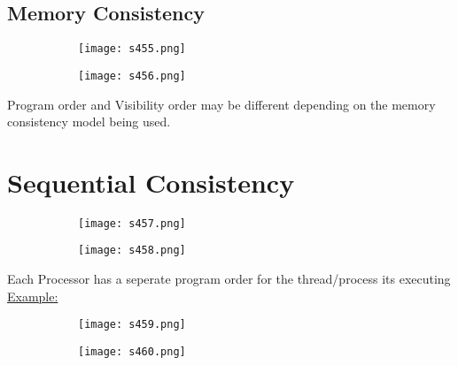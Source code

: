 \documentclass[8pt]{extreport}
\begin{document}
\subsection{Memory Consistency}
 \begin{figure}[H]
\begin{subfigure}[b]{0.4\linewidth}
\texttt{[image: s455.png]}
\end{subfigure}
\begin{subfigure}[b]{0.4\linewidth}
\texttt{[image: s456.png]}
\end{subfigure}
\end{figure}
Program order and Visibility order may be different depending on the memory consistency model being used.

\section{Sequential Consistency}



 \begin{figure}[H]
\begin{subfigure}[b]{0.4\linewidth}
\texttt{[image: s457.png]}
\end{subfigure}
\begin{subfigure}[b]{0.4\linewidth}
\texttt{[image: s458.png]}
\end{subfigure}
\end{figure}
Each Processor has a seperate program order for the thread/process its executing
\underline{Example:}
 \begin{figure}[H]
\begin{subfigure}[b]{0.4\linewidth}
\texttt{[image: s459.png]}
\end{subfigure}
\begin{subfigure}[b]{0.4\linewidth}
\texttt{[image: s460.png]}
\end{subfigure}
\end{figure}
\end{document}
